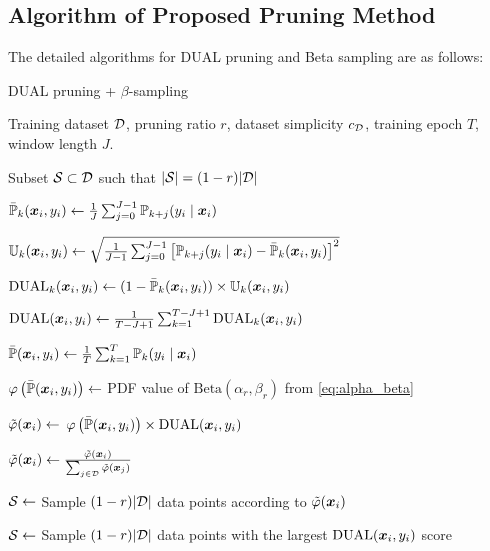 \subsection{Algorithm of Proposed Pruning Method}
\label{Appendix_algorithm}
The detailed algorithms for DUAL pruning and Beta sampling are as follows:
\begin{algorithm}[htb]
\begin{algorithmic}
    \caption{DUAL pruning + $\beta$-sampling}
    \label{alg:DUAL}

    \INPUT Training dataset ${\mathcal{D}}$, pruning ratio $r$, dataset simplicity $c_{\mathcal{D}}$, training epoch $T$, window length $J$.
    
    \OUTPUT Subset ${\mathcal{S}}\subset{\mathcal{D}}$ such that $\lvert{\mathcal{S}}\rvert = (1-r)\lvert{\mathcal{D}}\rvert$
    
            \STATE $\Bar{\mathbb{P}}_k({\bm{x}}_i, y_i) \leftarrow \frac{1}{J}\sum_{j=0}^{J-1} \mathbb{P}_{k+j}(y_i\mid {\bm{x}}_i)$
            
            \STATE $\mathbb{U}_k({\bm{x}}_i, y_i) \leftarrow \sqrt{ \frac{1}{J-1} \sum_{j=0}^{J-1} \left[ \mathbb{P}_{k+j}(y_i\mid {\bm{x}}_i) - \Bar{\mathbb{P}}_k({\bm{x}}_i, y_i) \right] ^2}$
            
            \STATE $\mathrm{DUAL}_k({\bm{x}}_i, y_i) \leftarrow (1-\Bar{\mathbb{P}}_k({\bm{x}}_i, y_i)) \times \mathbb{U}_k({\bm{x}}_i, y_i)$
        
        \ENDFOR
        
        \STATE $\mathrm{DUAL}({\bm{x}}_i, y_i) \leftarrow \frac{1}{T-J+1}\sum_{k=1}^{T-J+1} \mathrm{DUAL}_k({\bm{x}}_i, y_i)$
        
    \ENDFOR
    
        \STATE $\bar{\mathbb{P}}({\bm{x}}_i, y_i) \leftarrow \frac{1}{T}\sum_{k=1}^T \mathbb{P}_k(y_i \mid {\bm{x}}_i)$
        
        \STATE $\varphi \left(\bar{\mathbb{P}}({\bm{x}}_i, y_i)\right) \leftarrow$ PDF value of $\mathrm{Beta}(\alpha_r, \beta_r)$ from \cref{eq:alpha_beta}
        
        \STATE $\Tilde{\varphi} ({\bm{x}}_i) \leftarrow $ $\varphi\left(\Bar{\mathbb{P}} ({\bm{x}}_i, y_i)\right) \times \mathrm{DUAL}({\bm{x}}_i, y_i)$
    
    \ENDFOR
    
    \STATE $\Tilde{\varphi}({\bm{x}}_i) \leftarrow \frac{\Tilde{\varphi}({\bm{x}}_i)}{\sum_{j \in {\mathcal{D}}} \Tilde{\varphi}({\bm{x}}_j)}$
    
    \STATE ${\mathcal{S}} \leftarrow$ Sample $(1-r)\lvert {\mathcal{D}} \rvert$ data points according to $\Tilde{\varphi}({\bm{x}}_i)$
    
    \ELSE
    
    \STATE ${\mathcal{S}} \leftarrow$ Sample $(1-r)\lvert {\mathcal{D}} \rvert$ data points with the largest $\mathrm{DUAL}({\bm{x}}_i, y_i)$ score
    
    \ENDIF 
\end{algorithmic}
\end{algorithm}